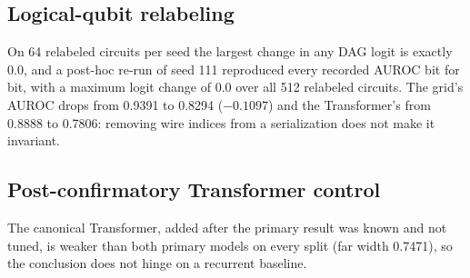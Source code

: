 \documentclass[conference,a4paper]{IEEEtran}
\begin{document}
\subsection{Logical-qubit relabeling}
On 64 relabeled circuits per seed the largest change in any DAG logit is exactly 0.0, and a post-hoc re-run of seed 111 reproduced every recorded AUROC bit for bit, with a maximum logit change of 0.0 over all 512 relabeled circuits. The grid's AUROC drops from 0.9391 to 0.8294 ($-0.1097$) and the Transformer's from 0.8888 to 0.7806: removing wire indices from a serialization does not make it invariant.

\subsection{Post-confirmatory Transformer control}
The canonical Transformer, added after the primary result was known and not tuned, is weaker than both primary models on every split (far width 0.7471), so the conclusion does not hinge on a recurrent baseline.
\end{document}
